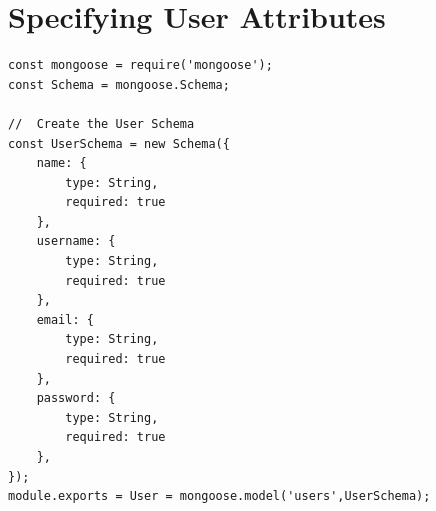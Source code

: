 \documentclass[twoside, a4paper, 12pt]{report}
\begin{document}
\section{Specifying User Attributes}
\begin{lstlisting}[frame=single]
const mongoose = require('mongoose');
const Schema = mongoose.Schema;

//  Create the User Schema
const UserSchema = new Schema({
    name: {
        type: String,
        required: true
    },
    username: {
        type: String,
        required: true
    },
    email: {
        type: String,
        required: true
    },
    password: {
        type: String,
        required: true
    },
});
module.exports = User = mongoose.model('users',UserSchema);

\end{lstlisting}
\end{document}
